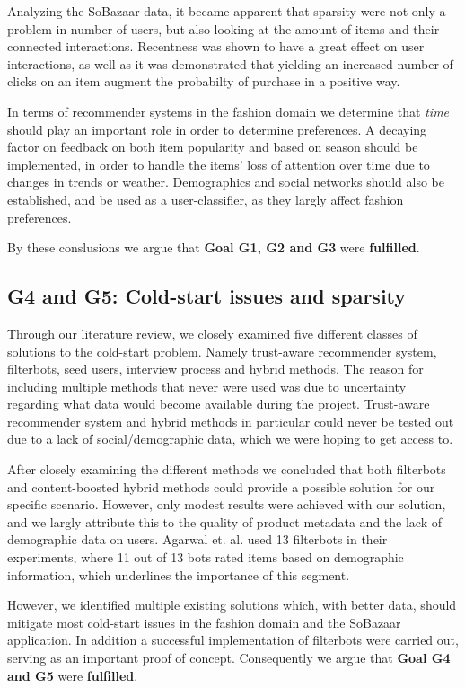Analyzing the SoBazaar data, it became apparent that sparsity were not only a
problem in number of users, but also looking at the amount of items and their
connected interactions. Recentness was shown to have a great effect on user
interactions, as well as it was demonstrated that yielding an increased number
of clicks on an item augment the probabilty of purchase in a positive way.

In terms of recommender systems in the fashion domain we determine that
\textit{time} should play an important role in order to determine preferences.
A decaying factor on feedback on both item popularity and based on season
should be implemented, in order to handle the items' loss of attention over
time due to changes in trends or weather. Demographics and social networks
should also be established, and be used as a user-classifier, as they largly
affect fashion preferences.

By these conslusions we argue that \textbf{Goal G1, G2 and G3} were
\textbf{fulfilled}.

\subsection{G4 and G5: Cold-start issues and sparsity}
\label{sec:cold-start-discussion}

Through our literature review, we closely examined five different classes of
solutions to the cold-start problem. Namely trust-aware recommender system,
filterbots, seed users, interview process and hybrid methods. The reason for
including multiple methods that never were used was due to uncertainty
regarding what data would become available during the project. Trust-aware
recommender system and hybrid methods in particular could never be tested out
due to a lack of social/demographic data, which we were hoping to get access
to.

After closely examining the different methods we concluded that both filterbots
and content-boosted hybrid methods could provide a possible solution for our
specific scenario. However, only modest results were achieved with our
solution, and we largly attribute this to the quality of product metadata and
the lack of demographic data on users. Agarwal et. al. \cite{Agarwal2009} used
13 filterbots in their experiments, where 11 out of 13 bots rated items based
on demographic information, which underlines the importance of this segment.

However, we identified multiple existing solutions which, with better data,
should mitigate most cold-start issues in the fashion domain and the SoBazaar
application. In addition a successful implementation of filterbots were carried
out, serving as an important proof of concept. Consequently we argue that
\textbf{Goal G4 and G5} were \textbf{fulfilled}.

